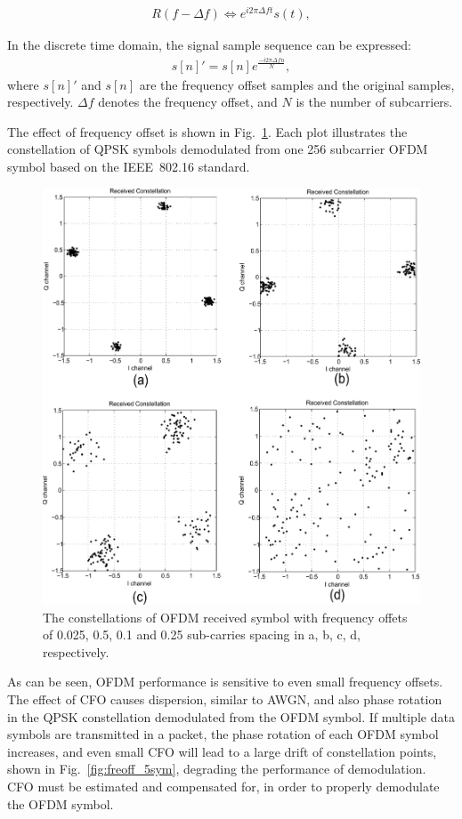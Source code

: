 \begin{eqnarray}
\label{equ:}
             R(f - \Delta f) \Leftrightarrow  e^{i2\pi \Delta ft} s(t),
\end{eqnarray}

In the discrete time domain, the signal sample sequence can be expressed:
\begin{eqnarray}
\label{equ:}
            s[n]' = s[n] e^{\frac{− i2\pi \Delta fn}{N}},
\end{eqnarray}
where $s[n]'$ and $s[n]$ are the frequency offset samples and the original samples, respectively.
$\Delta f$ denotes the frequency offset, and $N$ is the number of subcarriers.

The effect of frequency offset is shown in Fig.~\ref{fig:freoff_1sym}. Each plot illustrates the constellation of QPSK symbols demodulated from one 256 subcarrier OFDM symbol based on the IEEE~802.16 standard.

\begin{figure}
	\centerline{\includegraphics [width=0.8\columnwidth] {Figures/freoff_1sym.pdf} }
	\caption{The constellations of OFDM received symbol with frequency offets of 0.025, 0.5, 0.1 and 0.25 sub-carries spacing in a, b, c, d, respectively.}
	\label{fig:freoff_1sym}
\end{figure}

As can be seen, OFDM performance is sensitive to even small frequency offsets.
The effect of CFO causes dispersion, similar to AWGN, and also phase rotation in the QPSK constellation demodulated from the OFDM symbol.
If multiple data symbols are transmitted in a packet, the phase rotation of each OFDM symbol increases, and even small CFO will lead to a large drift of constellation points, shown in Fig.~\ref{fig:freoff_5sym}, degrading the performance of demodulation. CFO must be estimated and compensated for, in order to properly demodulate the OFDM symbol.

